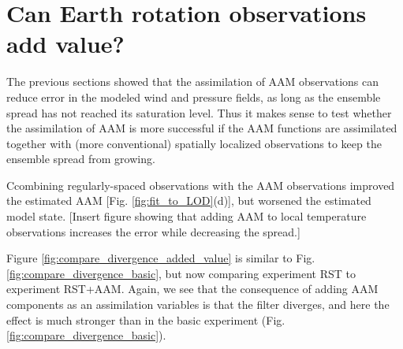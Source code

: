 
\section{Can Earth rotation observations add value?}

The previous sections showed that the assimilation of AAM observations can reduce error in the modeled wind and pressure fields, as long as the ensemble spread has not reached its saturation level. 
Thus it makes sense to test whether the assimilation of AAM is more successful if the AAM functions are assimilated together with (more conventional) spatially localized observations to keep the ensemble spread from growing.

Ccombining regularly-spaced observations with the AAM observations improved the estimated AAM [Fig. \ref{fig:fit_to_LOD}(d)], but worsened the estimated model state. 
\textcolor{alert}{[Insert figure showing that adding AAM to local temperature observations increases the error while decreasing the spread.]}

Figure \ref{fig:compare_divergence_added_value} is similar to Fig. \ref{fig:compare_divergence_basic}, but now comparing experiment RST to experiment RST+AAM.
Again, we see that the consequence of adding AAM components as an assimilation variables is that the filter diverges, and here the effect is much stronger than in the basic experiment (Fig. \ref{fig:compare_divergence_basic}).
 
